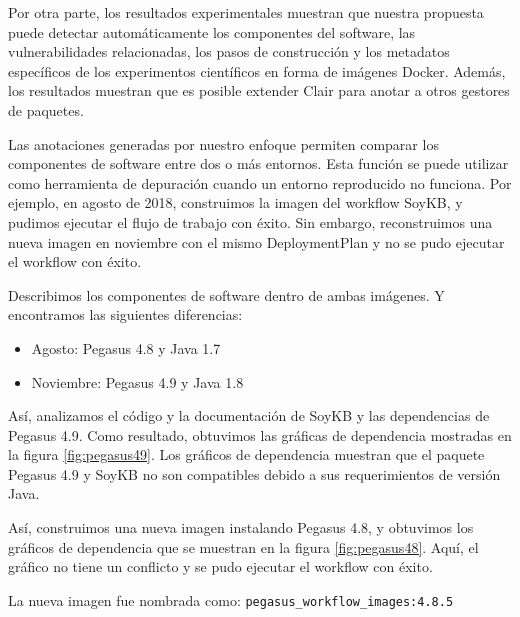 Por otra parte, los resultados experimentales muestran que nuestra propuesta puede detectar automáticamente los componentes del software, las vulnerabilidades relacionadas, los pasos de construcción y los metadatos específicos de los experimentos científicos en forma de imágenes Docker. 
Además, los resultados muestran que es posible extender Clair para anotar a otros gestores de paquetes. 

Las anotaciones generadas por nuestro enfoque permiten comparar los componentes de software entre dos o más entornos. Esta función se puede utilizar como herramienta de depuración cuando un entorno reproducido no funciona.
Por ejemplo, en agosto de 2018, construimos la imagen del workflow SoyKB, y pudimos ejecutar el flujo de trabajo con éxito. Sin embargo, reconstruimos una nueva imagen en noviembre con el mismo DeploymentPlan y no se pudo ejecutar el workflow con éxito.


Describimos los componentes de software dentro de ambas imágenes. Y encontramos las siguientes diferencias:
\begin{itemize}
    \item Agosto: Pegasus 4.8 y Java 1.7
    \item Noviembre: Pegasus 4.9 y Java 1.8
\end{itemize}

Así, analizamos el código y la documentación de SoyKB y las dependencias de Pegasus 4.9. Como resultado, obtuvimos las gráficas de dependencia mostradas en la figura \ref{fig:pegasus49}.  Los gráficos de dependencia muestran que el paquete Pegasus 4.9 y SoyKB no son compatibles debido a sus requerimientos de versión Java.

Así, construimos una nueva imagen instalando Pegasus 4.8, y obtuvimos los gráficos de dependencia que se muestran en la figura \ref{fig:pegasus48}. Aquí, el gráfico no tiene un conflicto y se pudo ejecutar el workflow con éxito.


La nueva imagen fue nombrada como: \verb|pegasus_workflow_images:4.8.5|


